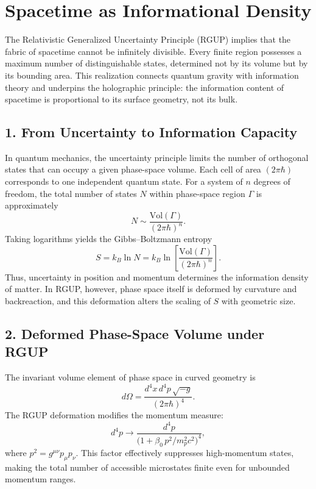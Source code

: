 \documentclass[11pt,oneside]{book}
\numberwithin{equation}{chapter}
\newcommand{\betaz}{\beta_0}
\begin{document}
\section{Spacetime as Informational Density}

The Relativistic Generalized Uncertainty Principle (RGUP) implies that the fabric of spacetime cannot be infinitely divisible.  
Every finite region possesses a maximum number of distinguishable states, determined not by its volume but by its bounding area.  
This realization connects quantum gravity with information theory and underpins the holographic principle: the information content of spacetime is proportional to its surface geometry, not its bulk.

\subsection*{1. From Uncertainty to Information Capacity}

In quantum mechanics, the uncertainty principle limits the number of orthogonal states that can occupy a given phase-space volume.  
Each cell of area $(2\pi\hbar)$ corresponds to one independent quantum state.  
For a system of $n$ degrees of freedom, the total number of states $N$ within phase-space region $\Gamma$ is approximately
\begin{equation}
N \sim \frac{\text{Vol}(\Gamma)}{(2\pi\hbar)^n}.
\end{equation}
Taking logarithms yields the Gibbs–Boltzmann entropy
\begin{equation}
S = k_B \ln N = k_B \ln\!\left[\frac{\text{Vol}(\Gamma)}{(2\pi\hbar)^n}\right].
\end{equation}
Thus, uncertainty in position and momentum determines the information density of matter.  
In RGUP, however, phase space itself is deformed by curvature and backreaction, and this deformation alters the scaling of $S$ with geometric size.

\subsection*{2. Deformed Phase-Space Volume under RGUP}

The invariant volume element of phase space in curved geometry is
\begin{equation}
d\Omega = \frac{d^4x\,d^4p\,\sqrt{-g}}{(2\pi\hbar)^4}.
\end{equation}
The RGUP deformation modifies the momentum measure:
\begin{equation}
d^4p \rightarrow 
\frac{d^4p}{\big(1+\betaz\,p^2/m_p^2 c^2\big)^4},
\end{equation}
where $p^2 = g^{\mu\nu}p_\mu p_\nu$.  
This factor effectively suppresses high-momentum states, making the total number of accessible microstates finite even for unbounded momentum ranges.
\end{document}
